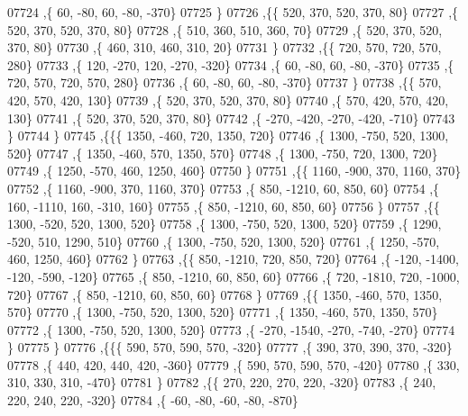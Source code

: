 \begin{DoxyCode}
07724     ,\{    60,   -80,    60,   -80,  -370\}
07725     \}
07726    ,\{\{   520,   370,   520,   370,    80\}
07727     ,\{   520,   370,   520,   370,    80\}
07728     ,\{   510,   360,   510,   360,    70\}
07729     ,\{   520,   370,   520,   370,    80\}
07730     ,\{   460,   310,   460,   310,    20\}
07731     \}
07732    ,\{\{   720,   570,   720,   570,   280\}
07733     ,\{   120,  -270,   120,  -270,  -320\}
07734     ,\{    60,   -80,    60,   -80,  -370\}
07735     ,\{   720,   570,   720,   570,   280\}
07736     ,\{    60,   -80,    60,   -80,  -370\}
07737     \}
07738    ,\{\{   570,   420,   570,   420,   130\}
07739     ,\{   520,   370,   520,   370,    80\}
07740     ,\{   570,   420,   570,   420,   130\}
07741     ,\{   520,   370,   520,   370,    80\}
07742     ,\{  -270,  -420,  -270,  -420,  -710\}
07743     \}
07744    \}
07745   ,\{\{\{  1350,  -460,   720,  1350,   720\}
07746     ,\{  1300,  -750,   520,  1300,   520\}
07747     ,\{  1350,  -460,   570,  1350,   570\}
07748     ,\{  1300,  -750,   720,  1300,   720\}
07749     ,\{  1250,  -570,   460,  1250,   460\}
07750     \}
07751    ,\{\{  1160,  -900,   370,  1160,   370\}
07752     ,\{  1160,  -900,   370,  1160,   370\}
07753     ,\{   850, -1210,    60,   850,    60\}
07754     ,\{   160, -1110,   160,  -310,   160\}
07755     ,\{   850, -1210,    60,   850,    60\}
07756     \}
07757    ,\{\{  1300,  -520,   520,  1300,   520\}
07758     ,\{  1300,  -750,   520,  1300,   520\}
07759     ,\{  1290,  -520,   510,  1290,   510\}
07760     ,\{  1300,  -750,   520,  1300,   520\}
07761     ,\{  1250,  -570,   460,  1250,   460\}
07762     \}
07763    ,\{\{   850, -1210,   720,   850,   720\}
07764     ,\{  -120, -1400,  -120,  -590,  -120\}
07765     ,\{   850, -1210,    60,   850,    60\}
07766     ,\{   720, -1810,   720, -1000,   720\}
07767     ,\{   850, -1210,    60,   850,    60\}
07768     \}
07769    ,\{\{  1350,  -460,   570,  1350,   570\}
07770     ,\{  1300,  -750,   520,  1300,   520\}
07771     ,\{  1350,  -460,   570,  1350,   570\}
07772     ,\{  1300,  -750,   520,  1300,   520\}
07773     ,\{  -270, -1540,  -270,  -740,  -270\}
07774     \}
07775    \}
07776   ,\{\{\{   590,   570,   590,   570,  -320\}
07777     ,\{   390,   370,   390,   370,  -320\}
07778     ,\{   440,   420,   440,   420,  -360\}
07779     ,\{   590,   570,   590,   570,  -420\}
07780     ,\{   330,   310,   330,   310,  -470\}
07781     \}
07782    ,\{\{   270,   220,   270,   220,  -320\}
07783     ,\{   240,   220,   240,   220,  -320\}
07784     ,\{   -60,   -80,   -60,   -80,  -870\}

\end{DoxyCode}
